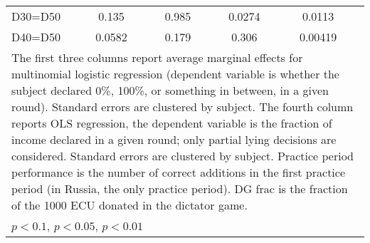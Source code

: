 \begin{tabular}{l|cccccc|cc}
D30=D50         &    0.135         &         &    0.985         &         &   0.0274         &         &   0.0113         &         \\
D40=D50         &   0.0582         &         &    0.179         &         &    0.306         &         &  0.00419         &         \\
\hline\hline
\multicolumn{9}{p{16cm}}{\tiny The first three columns report average marginal effects for multinomial logistic regression (dependent variable is whether the subject declared 0\%,  100\%, or something in between, in a given round). Standard errors are clustered by subject. The fourth column reports OLS regression, the dependent variable is the fraction of income declared in a given round; only partial lying decisions are considered. Standard errors are clustered by subject. Practice period performance is the number of correct additions in the first practice period (in Russia, the only practice period). DG frac is the fraction of the 1000 ECU donated in the dictator game.}\\
\multicolumn{9}{l}{\tiny \sym{*} \(p<0.1\), \sym{**} \(p<0.05\), \sym{***} \(p<0.01\)}\\
\end{tabular}